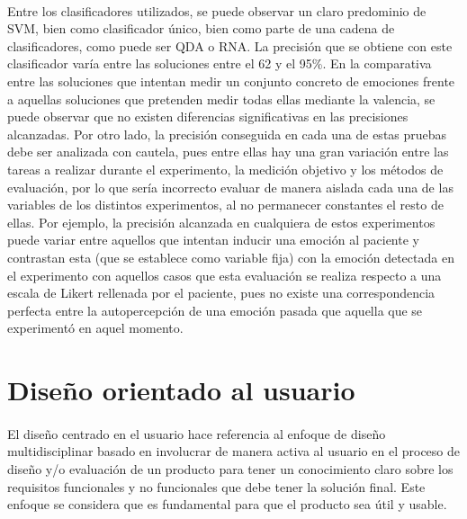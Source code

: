 \paragraph{}
Entre los clasificadores utilizados, se puede observar un claro predominio de SVM, bien como clasificador único, bien como parte de una cadena de clasificadores, como puede ser QDA o RNA. La precisión que se obtiene con este clasificador varía entre las soluciones entre el 62 y el 95\%. En la comparativa entre las soluciones que intentan medir un conjunto concreto de emociones frente a aquellas soluciones que pretenden medir todas ellas mediante la valencia, se puede observar que no existen diferencias significativas en las precisiones alcanzadas. Por otro lado, la precisión conseguida en cada una de estas pruebas debe ser analizada con cautela, pues entre ellas hay una gran variación entre las tareas a realizar durante el experimento, la medición objetivo y los métodos de evaluación, por lo que sería incorrecto evaluar de manera aislada cada una de las variables de los distintos experimentos, al no permanecer constantes el resto de ellas. Por ejemplo, la precisión alcanzada en cualquiera de estos experimentos puede variar entre aquellos que intentan inducir una emoción al paciente y contrastan esta (que se establece como variable fija) con la emoción detectada en el experimento con aquellos casos que esta evaluación se realiza respecto a una escala de Likert rellenada por el paciente, pues no existe una correspondencia perfecta entre la autopercepción de una emoción pasada que aquella que se experimentó en aquel momento.

\section{Diseño orientado al usuario}
\paragraph{}
El diseño centrado en el usuario hace referencia al enfoque de diseño multidisciplinar basado en involucrar de manera activa al usuario en el proceso de diseño y/o evaluación de un producto para tener un conocimiento claro sobre los requisitos funcionales y no funcionales que debe tener la solución final. Este enfoque se considera que es fundamental para que el producto sea útil y usable\citep{mao2001user}.

